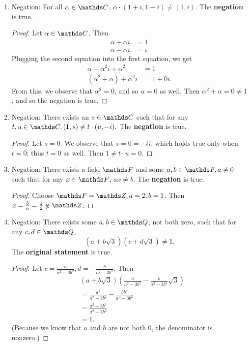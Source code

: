 \documentclass{review-sheet}
\begin{document}
\begin{solution}
  \begin{enumerate}[label=(\alph*)]
    \item Negation: For all $\alpha\in \C$, $ \alpha\cdot (1+i,1-i) \neq (1,i)$. The
      \textbf{negation} is true.
      \begin{proof}[Proof]
        Let $ \alpha\in \C$. Then
        \begin{align*}
          \alpha+\alpha i&= 1 \\
          \alpha-\alpha i &= i
        .\end{align*} Plugging the second equation into the first equation, we get
        \begin{align*}
          \alpha+\alpha^2i+\alpha^2&= 1 \\
          \left( \alpha^2+\alpha \right) +\alpha^2i&=1+0i
        .\end{align*} From this, we observe that $\alpha^2=0$, and so $\alpha=0$ as well. Then
        $\alpha^2+\alpha=0\neq 1$, and so the negation is true.
      \end{proof}
      
    \item Negation: There exists an $s \in \C$ such that for any $t,u\in \C, (1,s)\neq t\cdot
      (u,-i).$ The \textbf{negation} is true.
      \begin{proof}[Proof]
        Let $s=0$. We observe that $s=0=-ti$, which holds true only when  $t=0$; thus  $t=0$ as
        well. Then  $1\neq t\cdot u=0$.
      \end{proof}
      
    \item Negation: There exists a field $\F$ and some $a,b\in \F, a\neq 0$ such that for any $x\in
      \F$, $ax\neq b$. The \textbf{negation} is true.
      \begin{proof}[Proof]
        Choose $ \F=\Z, a=2,b=1$. Then $x=\frac{b}{a}=\frac{1}{2}\not\in \Z$.
      \end{proof}

    \item Negation: There exists some $a,b\in \Q$, not both zero, such that for any $c,d\in \Q$, \[
        \left( a+b\sqrt{3}  \right) \left( c+d\sqrt{3}  \right)  \neq 1
    .\] The \textbf{original statement} is true.
    \begin{proof}[Proof]
      Let $c=\frac{a}{a^2-3b^2}, d=-\frac{b}{a^2-3b^2}$. Then
      \begin{align*}
        &\left( a+b\sqrt{3}  \right) \left( \frac{a}{a^2-3b^2}-\frac{b}{a^2-3b^2}\sqrt{3}  \right)\\
        &= \frac{a^2}{a^2-3b^2} -\frac{3b^2}{a^2-3b^2}\\
        &=\frac{a^2-3b^2}{a^2-3b^2}\\
        &=1
      .\end{align*} (Because we know that  $a$ and $b$ are not both $0$, the denominator is nonzero.)
    \end{proof}
    
      
  \end{enumerate}
\end{solution}
\end{document}
